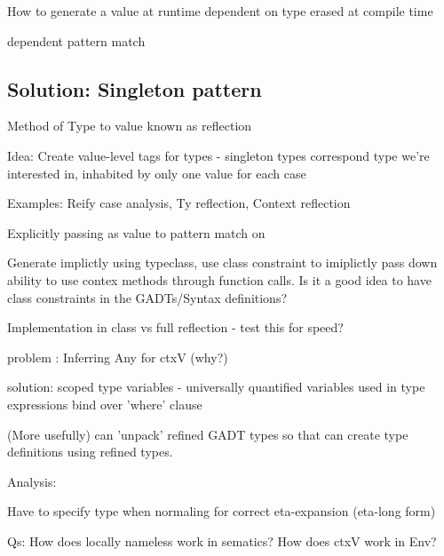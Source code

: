 How to generate a value at runtime dependent on type erased at compile time

dependent pattern match \cite{SingletonsGuide}

\subsection{Solution: Singleton pattern}

Method of Type to value known as reflection \cite{SingletonsGuide}

Idea: Create value-level tags for types - singleton types correspond type we're interested in, inhabited by only one value for each case

Examples: Reify case analysis, Ty reflection, Context reflection

Explicitly passing as value to pattern match on

Generate implictly using typeclass, use class constraint to imiplictly pass down ability to use contex methods through function calls.
Is it a good idea to have class constraints in the GADTs/Syntax definitions?

Implementation in class vs full reflection - test this for speed?

problem : Inferring Any for ctxV (why?)

solution: scoped type variables - universally quantified variables used in type expressions bind over 'where' clause

(More usefully) can 'unpack' refined GADT types so that can create type definitions using refined types.

Analysis:

Have to specify type when normaling for correct eta-expansion (eta-long form)

Qs:
How does locally nameless work in sematics?
How does ctxV work in Env?
